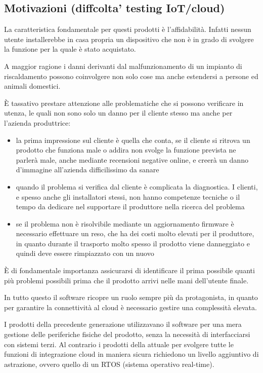 \documentclass[a4paper,titlepage]{article}
\begin{document}
\subsection{Motivazioni (diffcolta' testing IoT/cloud)}

La caratteristica fondamentale per questi prodotti è l'affidabilità. 
Infatti nessun utente installerebbe in casa propria un dispositivo che 
non è in grado di svolgere la funzione per la quale è stato acquistato. 

A maggior ragione i danni derivanti dal malfunzionamento di un impianto 
di riscaldamento possono coinvolgere non solo cose ma anche estendersi 
a persone ed animali domestici. 

È tassativo prestare attenzione alle problematiche che si possono verificare 
in utenza, le quali non sono solo un danno per il cliente stesso ma anche 
per l'azienda produttrice:

\begin{itemize}
\item la prima impressione sul cliente è quella che conta, se il cliente si ritrova
    un prodotto che funziona male o addira non svolge la funzione prevista ne parlerà
    male, anche mediante recensioni negative online, e creerà un danno d'immagine all'azienda
    difficilissimo da sanare
\item quando il problema si verifica dal cliente è complicata la diagnostica. I clienti,
    e spesso anche gli installatori stessi, non hanno competenze tecniche o il 
    tempo da dedicare nel supportare il produttore nella ricerca del problema
\item se il problema non è risolvibile mediante un aggiornamento firmware è necessario
    effettuare un reso, che ha dei costi molto elevati per il produttore, in quanto
    durante il trasporto molto spesso il prodotto viene danneggiato e quindi deve
    essere rimpiazzato con un nuovo
\end{itemize}

È di fondamentale importanza assicurarsi di identificare il prima possibile quanti
più problemi possibili prima che il prodotto arrivi nelle mani dell'utente finale.

In tutto questo il software ricopre un ruolo sempre più da protagonista, in quanto 
per garantire la connettività al cloud è necessario gestire una complessità elevata. 

I prodotti della precedente generazione utilizzavano il software per una mera gestione 
delle periferiche fisiche del prodotto, senza la necessità di interfacciarsi con sistemi 
terzi. Al contrario i prodotti della attuale per svolgere tutte le funzioni di 
integrazione cloud in maniera sicura richiedono un livello aggiuntivo di astrazione, 
ovvero quello di un RTOS (sistema operativo real-time). 
\end{document}
